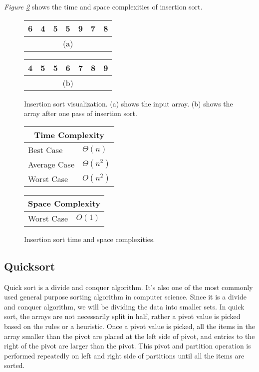\textit{Figure \ref{fig:insertionsort}} shows the time and space complexities of insertion sort.

\begin{figure}[!ht]
    \centering
    \begin{tabular}{|c|c|c|c|c|c|c|}
    \hline
    6 & 4 & 5 & 5 & 9 & 7 & 8 \\
    \hline
    \multicolumn{7}{c}{(a)} \\
    \end{tabular}
    \quad\quad
    \begin{tabular}{|c|c|c|c|c|c|c|}
    \hline
    4 & 5 & 5 & 6 & 7 & 8 & 9 \\
    \hline
    \multicolumn{7}{c}{(b)} \\
    \end{tabular}
    
    \caption{Insertion sort visualization. (a) shows the input array. (b) shows the array after one pass of insertion sort.}
    \label{fig:insertionsort_ex}
\end{figure}

\begin{figure}[!ht]
    \centering
    \begin{tabular}{l|l}
    \multicolumn{2}{c}{\textbf{Time Complexity}} \\
    \hline
    Best Case    & $\Theta(n)$ \\
    Average Case & $\Theta(n^2)$ \\
    Worst Case   & $O(n^2)$ \\
    \end{tabular}
    \quad\quad
    \begin{tabular}{l|l}
    \multicolumn{2}{c}{\textbf{Space Complexity}} \\
    \hline
    Worst Case   & $O(1)$ \\
    \end{tabular}
    
    \caption{Insertion sort time\cite{clrs2009} and space complexities\cite{big-o}.}
    \label{fig:insertionsort}
\end{figure}


\subsection{Quicksort}

Quick sort is a divide and conquer algorithm. It’s also one of the most commonly used general purpose sorting algorithm in computer science. Since it is a divide and conquer algorithm, we will be dividing the data into smaller sets. In quick sort, the arrays are not necessarily split in half, rather a pivot value is picked based on the rules or a heuristic. Once a pivot value is picked, all the items in the array smaller than the pivot are placed at the left side of pivot, and entries to the right of the pivot are larger than the pivot. This pivot and partition operation is performed repeatedly on left and right side of partitions until all the items are sorted. 

